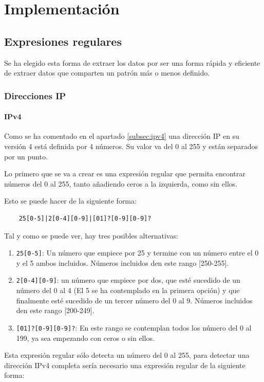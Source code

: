 \chapter{Implementación}
\section{Expresiones regulares}\label{imp:expresiones_regulares}
Se ha elegido esta forma de extraer los datos por ser una forma rápida y eficiente de extraer datos que comparten un patrón más o menos definido.
\subsection{Direcciones IP}
\subsubsection{IPv4}
Como se ha comentado en el apartado \ref{subsec:ipv4} una dirección IP en su versión 4 está definida por 4 números. Su valor va del 0 al 255 y están separados por un punto. 

Lo primero que se va a crear es una expresión regular que permita encontrar números del 0 al 255, tanto añadiendo ceros a la izquierda, como sin ellos. 

Esto se puede hacer de la siguiente forma: 
\begin{verbatim}
    25[0-5]|2[0-4][0-9]|[01]?[0-9][0-9]?
\end{verbatim}

Tal y como se puede ver, hay tres posibles alternativas: 
\begin{enumerate}
    \item \verb|25[0-5]|: Un número que empiece por 25 y termine con un número entre el 0 y el 5 ambos incluidos. Números incluidos den este rango [250-255].
    \item \verb|2[0-4][0-9]|: un número que empiece por dos, que esté sucedido de un número del 0 al 4 (El 5 se ha contemplado en la primera opción) y que finalmente esté sucedido de un tercer número del 0 al 9. Números incluidos den este rango [200-249].
    \item \verb|[01]?[0-9][0-9]?|: En este rango se contemplan todos los número del 0 al 199, ya sea empezando con ceros o sin ellos.  
\end{enumerate}
Esta expresión regular sólo detecta un número del 0 al 255, para detectar una dirección IPv4 completa sería necesario una expresión regular de la siguiente forma: 

